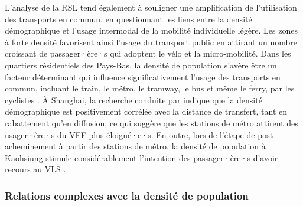 \begin{refsegment}
L'analyse de la \acrshort{RSL} tend également à souligner une amplification de l'utilisation des transports en commun, en questionnant les liens entre la densité démographique et l'usage intermodal de la mobilité individuelle légère. Les zones à forte densité favorisent ainsi l'usage du transport public en attirant un nombre croissant de passager·ère·s qui adoptent le vélo et la micro-mobilité. Dans les quartiers résidentiels des Pays-Bas, la densité de population s'avère être un facteur déterminant qui influence significativement l'usage des transports en commun, incluant le train, le métro, le tramway, le bus et même le ferry, par les cyclistes \textcolor{blue}{\autocite[334]{martens_promoting_2007}}. À Shanghai, la recherche conduite par \textcolor{blue}{\textcite[10]{li_exploring_2021}} indique que la densité démographique est positivement corrélée avec la distance de transfert, tant en \gls{rabattement} qu'en \gls{diffusion}, ce qui suggère que les stations de métro attirent des usager·ère·s du \acrshort{VFF} plus éloigné·e·s. En outre, lors de l'étape de post-acheminement à partir des stations de métro, la densité de population à Kaohsiung stimule considérablement l'intention des passager·ère·s d'avoir recours au \acrshort{VLS} \textcolor{blue}{\autocite[29]{cheng_expanding_2018}}.%

\subsubsection*{Relations complexes avec la densité de population
    \label{chap2:relations-complexes-densite-population}
    }
    

\end{refsegment}
